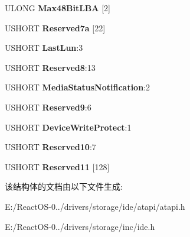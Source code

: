 \begin{DoxyCompactItemize}
U\+L\+O\+NG {\bfseries Max48\+Bit\+L\+BA} \mbox{[}2\mbox{]}
\item 
\mbox{\label{struct___i_d_e_n_t_i_f_y___d_a_t_a_a7a7d68820f9e3669ef99aeac85a395bc}} 
U\+S\+H\+O\+RT {\bfseries Reserved7a} \mbox{[}22\mbox{]}
\item 
\mbox{\label{struct___i_d_e_n_t_i_f_y___d_a_t_a_a2046ce1d40407627be917d6f5b05bae5}} 
U\+S\+H\+O\+RT {\bfseries Last\+Lun}\+:3
\item 
\mbox{\label{struct___i_d_e_n_t_i_f_y___d_a_t_a_a2796ebb332fc58fdeb26d0d13e38f464}} 
U\+S\+H\+O\+RT {\bfseries Reserved8}\+:13
\item 
\mbox{\label{struct___i_d_e_n_t_i_f_y___d_a_t_a_a51c834e422db455d760edaeb70076be1}} 
U\+S\+H\+O\+RT {\bfseries Media\+Status\+Notification}\+:2
\item 
\mbox{\label{struct___i_d_e_n_t_i_f_y___d_a_t_a_a521ce3f3936246955a5a73314201fc99}} 
U\+S\+H\+O\+RT {\bfseries Reserved9}\+:6
\item 
\mbox{\label{struct___i_d_e_n_t_i_f_y___d_a_t_a_a11a0738f93b8fbfb9f86addd8aa585db}} 
U\+S\+H\+O\+RT {\bfseries Device\+Write\+Protect}\+:1
\item 
\mbox{\label{struct___i_d_e_n_t_i_f_y___d_a_t_a_a4b6f5a4189d6bbe669b2dba4d0fd9ed8}} 
U\+S\+H\+O\+RT {\bfseries Reserved10}\+:7
\item 
\mbox{\label{struct___i_d_e_n_t_i_f_y___d_a_t_a_aa2c1f98477395492758678fd8acf3732}} 
U\+S\+H\+O\+RT {\bfseries Reserved11} \mbox{[}128\mbox{]}
\end{DoxyCompactItemize}


该结构体的文档由以下文件生成\+:\begin{DoxyCompactItemize}
\item 
E\+:/\+React\+O\+S-\/0../drivers/storage/ide/atapi/atapi.\+h\item 
E\+:/\+React\+O\+S-\/0../drivers/storage/inc/ide.\+h\end{DoxyCompactItemize}
